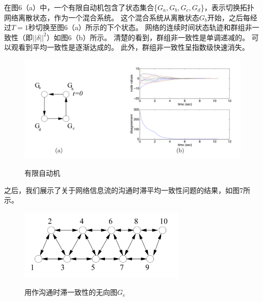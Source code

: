 \documentclass{article}
\begin{document}
在图6（a）中，一个有限自动机包含了状态集合\{$G_a, G_b, G_c, G_d$\}，表示切换拓扑网络离散状态，作为一个混合系统。
这个混合系统从离散状态$G_b$开始，之后每经过$T=1$秒切换至图6（a）所示的下个状态。
网络的连续时间状态轨迹和群组非一致性（即$||\delta||^2$）如图6（b）所示。
清楚的看到，群组非一致性是单调递减的。
可以观看到平均一致性是逐渐达成的。
此外，群组非一致性呈指数级快速消失。
\begin{figure}[htbp]
    \centering
    \includegraphics[width=14.5cm]{figures/Fig6-Automaton.jpeg}
    \label{Automaton}
    \caption{有限自动机}
\end{figure}

之后，我们展示了关于网络信息流的沟通时滞平均一致性问题的结果，如图7所示。
\begin{figure}[htbp]
    \centering
    \includegraphics[width=8cm]{figures/Fig7-Undirected.jpeg}
    \label{Undirected}
    \caption{用作沟通时滞一致性的无向图$G_e$}
\end{figure}
\end{document}
